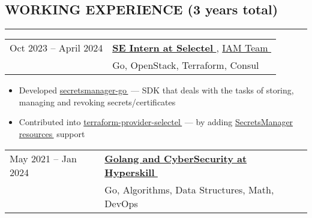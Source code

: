 \documentclass[11pt]{res} %
\let\orighref\href
\renewcommand{\href}[2]{\orighref{#1}{#2\,\faExternalLink}}
\begin{document}

    \address{May 2024 \\ Saint Petersburg, Russia}

    \address{
        \faEnvelopeO \, \href{mailto:imenbearpigi@gmail.com}{misterzurg@gmail.com} \\
        \faGithub    \, \href{https://github.com/MisterZurg}{github.com/MisterZurg} \\
        \faLinkedinSquare  \, \href{linkedin.com/in/misterzurg/}{linkedin.com/in/misterzurg}
    }

    \begin{resume}
        \section{\uppercase{Working Experience} (3 years total)}

        \begin{spacing}{0.3}
            \textcolor[RGB]{220,220,220}{\rule{\linewidth}{0.4pt}}
        \end{spacing}

        \begin{tabular}{ll}
            Oct 2023 -- April 2024 \qquad & \textbf{\href{https://selectel.ru/}{SE Intern at Selectel}}, \href{https://selectel.ru/services/iam/}{IAM Team} \\
            & Go, OpenStack, Terraform, Consul \\   
        \end{tabular}

         \begin{itemize} \itemsep -2pt
             \item Developed \href{https://github.com/selectel/secretsmanager-go}{secretsmanager-go} — SDK that deals with the tasks of storing, managing and revoking secrets/certificates
             \item Contributed into \href{https://github.com/selectel/terraform-provider-selectel}{terraform-provider-selectel} — by adding \href{https://github.com/selectel/terraform-provider-selectel/pull/264}{SecretsManager resources} support
        \end{itemize} 
        
        \begin{tabular}{ll}
            May 2021 -- Jan 2024 \qquad & \textbf{\href{https://hyperskill.org}{Golang and CyberSecurity at Hyperskill}} \\
            & Go, Algorithms, Data Structures, Math, DevOps \\
        \end{tabular}


\end{resume}
\end{document}
